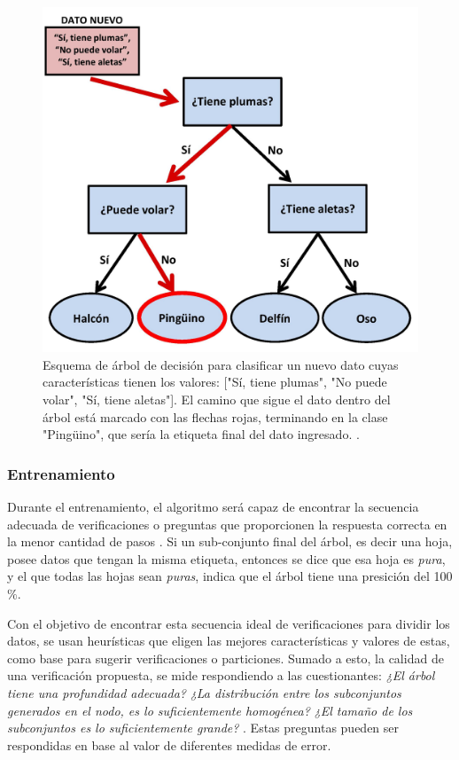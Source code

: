 \begin{figure}[h]
  \centering
  \includegraphics[width=13cm]{figures/image13.jpg}
  \caption[Esquema de árbol de decisión para clasificar un nuevo dato (de tipo \textit{animal}).]{Esquema de árbol de decisión para clasificar un nuevo dato cuyas características tienen los valores: ["Sí, tiene plumas", "No puede volar", "Sí, tiene aletas"]. El camino que sigue el dato dentro del árbol está marcado con las flechas rojas, terminando en la clase "Pingüino", que sería la etiqueta final del dato ingresado.
  .}
  \label{fig:tree2}
\end{figure}

\subsubsection{Entrenamiento}
Durante el entrenamiento, el algoritmo será capaz de encontrar la secuencia adecuada de verificaciones o preguntas que proporcionen la respuesta correcta en la menor cantidad de pasos \cite{Muller}. Si un sub-conjunto final del árbol, es decir una hoja, posee datos que tengan la misma etiqueta, entonces se dice que esa hoja es \textit{pura}, y el que todas las hojas sean \textit{puras}, indica que el árbol tiene una presición del 100$\%$.

Con el objetivo de encontrar esta secuencia ideal de verificaciones para dividir los datos, se usan heurísticas que eligen las mejores características y valores de estas, como base para sugerir verificaciones o particiones. Sumado a esto, la calidad de una verificación propuesta, se mide respondiendo a las cuestionantes: \textit{¿El árbol tiene una profundidad adecuada?} \textit{¿La distribución entre los subconjuntos generados en el nodo, es lo suficientemente homogénea?} \textit{¿El tamaño de los subconjuntos es lo suficientemente grande?} \cite[Capítulo 16]{Murphy}. Estas preguntas pueden ser respondidas en base al valor de diferentes medidas de error.
%

